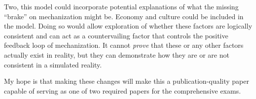 \documentclass{article}
\begin{document}
Two, this model could incorporate potential explanations of what the missing
``brake'' on mechanization might be. Economy and culture could be included in
the model. Doing so would allow exploration of whether these factors are
logically consistent and can act as a countervailing factor that controls the
positive feedback loop of mechanization. It cannot \textit{prove} that these or
any other factors actually exist in reality, but they can demonstrate how they
are or are not consistent in a simulated reality.

My hope is that making these changes will make this a publication-quality paper
capable of serving as one of two required papers for the comprehensive exams.

\newpage

\printbibliography[heading=bibnumbered]
\end{document}
